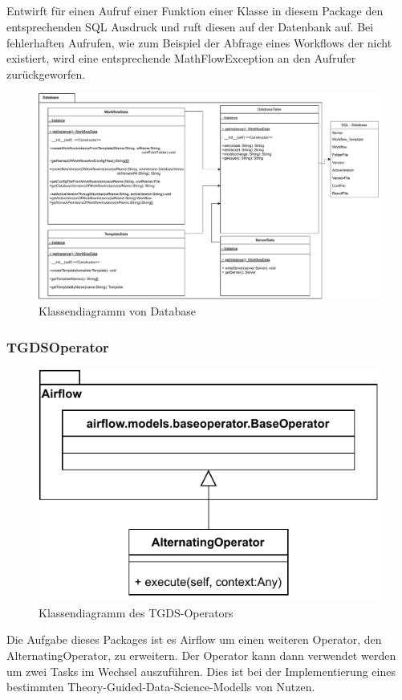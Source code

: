 \subsection{}
Entwirft für einen Aufruf einer Funktion einer Klasse in diesem Package den entsprechenden SQL Ausdruck und ruft diesen auf der Datenbank auf.
Bei fehlerhaften Aufrufen, wie zum Beispiel der Abfrage eines Workflows der nicht existiert, wird eine entsprechende MathFlowException an den Aufrufer zurückgeworfen.
\begin{figure}[h]
	\centering
	\includegraphics[width=1\textwidth]{res/Database_Package.pdf} 
	\caption{Klassendiagramm von Database}
	\label{fig:database_package}
\end{figure}


\subsubsection{TGDSOperator}
\begin{figure}[h]
    \includegraphics[width=1\textwidth]{res/Klassen/tgdsOp.pdf}
    \caption{Klassendiagramm des TGDS-Operators}
\end{figure}
Die Aufgabe dieses Packages ist es Airflow um einen weiteren Operator, den AlternatingOperator, zu erweitern.
Der Operator kann dann verwendet werden um zwei Tasks im Wechsel auszuführen. 
Dies ist bei der Implementierung eines bestimmten Theory-Guided-Data-Science-Modells von Nutzen. 



